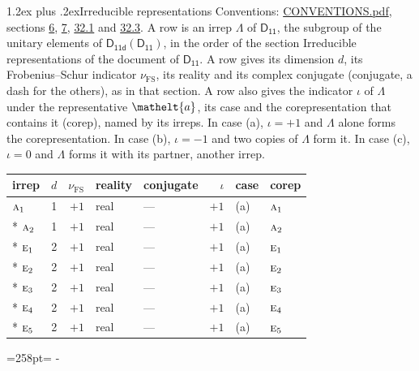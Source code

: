 \documentclass[10pt,a4paper]{article}
\makeatletter
\renewcommand\section{\@startsection{section}{1}{\z@}{-3ex plus -1ex minus -.2ex}%
  {1.2ex plus .2ex}{\normalfont\large\sffamily\bfseries\color{parttitle}}}
\newcommand{\needspace}[1]{\par\penalty-100\begingroup\dimen0=#1\relax\dimen2=\pagegoal
  \advance\dimen2-\pagetotal\ifdim\dimen0>\dimen2\relax\ifdim\dimen2>0pt\vfil\break\fi\fi
  \endgroup}
\numberwithin{equation}{section}
\newcommand{\eltfont}[1]{{\let\sigma\eltsigma\mathelt{#1}}}
\newcommand{\grp}[1]{\mathsf{#1}}
\newcommand{\irr}[1]{\text{\normalfont\scshape #1}}
\newcommand{\elt}[1]{\eltfont{#1}}
\newcommand{\fsind}{\nu_{\mathrm{FS}}}
\makeatother
\begin{document}
\section{Irreducible representations}\label{s:irreps}
Conventions: \href{../../CONVENTIONS.pdf}{CONVENTIONS.pdf}, sections \href{../../../rotation/CONVENTIONS.pdf\#conv.6}{6}, \href{../../../rotation/CONVENTIONS.pdf\#conv.7}{7}, \href{../../CONVENTIONS.pdf\#conv.32.1}{32.1} and \href{../../CONVENTIONS.pdf\#conv.32.3}{32.3}.
\leavevmode\label{n:irrep.Delta}A row is an irrep $\Lambda$ of $\grp{D_{11}}$, the subgroup of the unitary elements of $\grp{D_{11d}}(\grp{D_{11}})$, in the order of the section Irreducible representations of the document of \href{../../../rotation/data/pdf/D11.pdf}{$\grp{D_{11}}$}. \label{n:index.dimension}\label{n:index.frobenius}\label{n:head.irrep}\label{n:head.reality}\label{n:head.conjugate}A row gives its dimension $d$, its Frobenius--Schur indicator $\fsind$, its reality and its complex conjugate (conjugate, a dash for the others), as in that section. \label{n:head.case.corep}\label{n:head.corep}A row also gives the indicator $\iota$ of $\Lambda$ under the representative $\elt{a}$, its case and the corepresentation that contains it (corep), named by its irreps. In case (a), $\iota = +1$ and $\Lambda$ alone forms the corepresentation. In case (b), $\iota = -1$ and two copies of $\Lambda$ form it. In case (c), $\iota = 0$ and $\Lambda$ forms it with its partner, another irrep.
\setlength{\emergencystretch}{2em}\par\setlength{\emergencystretch}{0pt}
{\small\renewcommand{\arraystretch}{1.25}\setlength{\tabcolsep}{4pt}\begin{longtable}{@{}lrrllrll@{}}\toprule
irrep & $d$ & $\fsind$ & reality & conjugate & $\iota$ & case & corep\\\midrule\endhead
\bottomrule\endfoot\endlastfoot
$\irr{a}_{1}$ & 1 & $+1$ & real & --- & $+1$ & (a) & $\irr{a}_{1}$\\*
$\irr{a}_{2}$ & 1 & $+1$ & real & --- & $+1$ & (a) & $\irr{a}_{2}$\\*
$\irr{e}_{1}$ & 2 & $+1$ & real & --- & $+1$ & (a) & $\irr{e}_{1}$\\*
$\irr{e}_{2}$ & 2 & $+1$ & real & --- & $+1$ & (a) & $\irr{e}_{2}$\\*
$\irr{e}_{3}$ & 2 & $+1$ & real & --- & $+1$ & (a) & $\irr{e}_{3}$\\*
$\irr{e}_{4}$ & 2 & $+1$ & real & --- & $+1$ & (a) & $\irr{e}_{4}$\\*
$\irr{e}_{5}$ & 2 & $+1$ & real & --- & $+1$ & (a) & $\irr{e}_{5}$\\
\bottomrule\end{longtable}}
\needspace{258pt}
\end{document}
